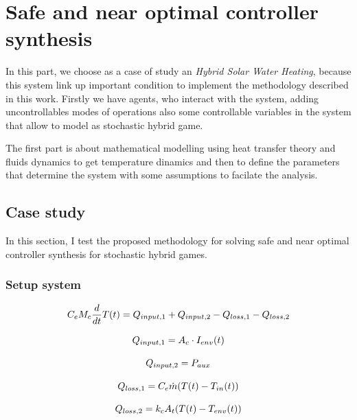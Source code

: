 
\chapter{Safe and near optimal controller synthesis}

\label{ch:proposal}
In this part, we choose as a case of study an \emph{Hybrid Solar Water
Heating}, because this system link up important condition to implement the
methodology described in this work. Firstly we have agents, who interact with 
the system, adding uncontrollables modes of operations also some controllable
variables in the system that allow to model as stochastic hybrid game.

The first part is about mathematical modelling using heat transfer
theory and fluids dynamics to get temperature dinamics and then 
to define the parameters that determine the system with some
assumptions to facilate the analysis.

\section{Case study}
In this section, I test the proposed methodology for solving safe and near optimal controller synthesis 
for stochastic hybrid games.



\subsection{Setup system}

\begin{equation}
    C_eM_{c}\frac{d}{dt}T(t) =  Q_{input,1} + Q_{input,2} - Q_{loss,1} -  Q_{loss,2}
\end{equation}

\begin{equation}
    Q_{input,1} =   A_c\cdot I_{env}(t)
\end{equation}

\begin{equation}
    Q_{input,2} =   P_{aux}
\end{equation}

\begin{equation}
    Q_{loss,1} =  C_e \dot{m} (T(t)-T_{in}(t))
\end{equation}

\begin{equation}
    Q_{loss,2} =  k_c A_t (T(t)-T_{env}(t))
\end{equation}

